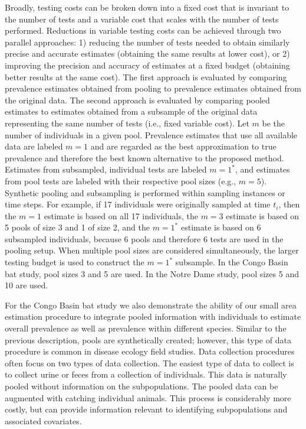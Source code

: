 \documentclass{article}
\begin{document}
Broadly, testing costs can be broken down into a fixed cost that is invariant to the number of tests and a variable cost that scales with the number of tests performed. Reductions in variable testing costs can be achieved through two parallel approaches: 1) reducing the number of tests needed to obtain similarly precise and accurate estimates (obtaining the same results at lower cost), or 2) improving the precision and accuracy of estimates at a fixed budget (obtaining better results at the same cost). The first approach is evaluated by comparing prevalence estimates obtained from pooling to prevalence estimates obtained from the original data. The second approach is evaluated by comparing pooled estimates to estimates obtained from a subsample of the original data representing the same number of tests (i.e., fixed variable cost). Let $m$ be the number of individuals in a given pool. Prevalence estimates that use all available data are labeled $m=1$ and are regarded as the best approximation to true prevalence and therefore the best known alternative to the proposed method. Estimates from subsampled, individual tests are labeled $m=1^*$, and estimates from pool tests are labeled with their respective pool sizes (e.g., $m=5$). Synthetic pooling and subsampling is performed within sampling instances or time steps. For example, if 17 individuals were originally sampled at time $t_i$, then the $m=1$ estimate is based on all 17 individuals, the $m=3$ estimate is based on 5 pools of size 3 and 1 of size 2, and the $m=1^*$ estimate is based on 6 subsampled individuals, because 6 pools and therefore 6 tests are used in the pooling setup. When multiple pool sizes are considered simultaneously, the larger testing budget is used to construct the $m=1^*$ subsample. In the Congo Basin bat study, pool sizes 3 and 5 are used. In the Notre Dame study, pool sizes 5 and 10 are used. 

For the Congo Basin bat study we also demonstrate the ability of our small area estimation procedure to integrate pooled information with individuals to estimate overall prevalence as well as prevalence within different species. Similar to the previous description, pools are synthetically created; however, this type of data procedure is common in disease ecology field studies. Data collection procedures often focus on two types of data collection. The easiest type of data to collect is to collect urine or feces from a collection of individuals. This data is naturally pooled without information on the subpopulations. The pooled data can be augmented with catching individual animals. This process is considerably more costly, but can provide information relevant to identifying subpopulations and associated covariates.
\end{document}
